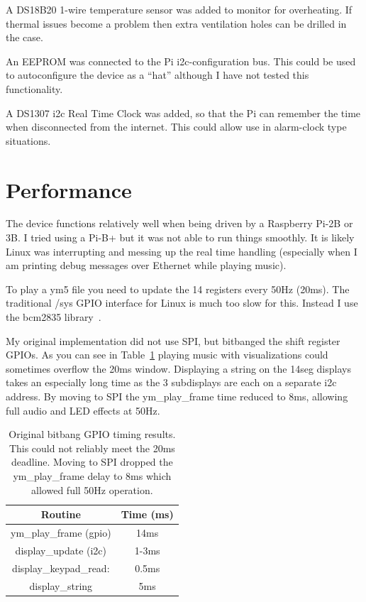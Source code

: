 \documentclass[11pt]{article}
\begin{document}
A DS18B20 1-wire temperature sensor was added to monitor for overheating.
If thermal issues become a problem then
extra ventilation holes can be drilled in the case.

An EEPROM was connected to the Pi i2c-configuration bus.
This could be used to autoconfigure the device as a ``hat'' although
I have not tested this functionality.

A DS1307 i2c Real Time Clock was added, so that the Pi can remember
the time when disconnected from the internet.
This could allow use in alarm-clock type situations.


\section{Performance}

The device functions relatively well when being driven by a 
Raspberry Pi-2B or 3B.
I tried using a Pi-B+ but it was not able to run things smoothly.
It is likely Linux was interrupting and messing up the real time handling
(especially when I am printing debug messages over Ethernet while playing
music).

To play a ym5 file you need to update the 14 registers every 50Hz
(20ms).
The traditional /sys GPIO interface for Linux is much too slow for this.
Instead I use the bcm2835 library~\cite{bcm2835}.

My original implementation did not use SPI, but bitbanged the 
shift register GPIOs.
As you can see in Table~\ref{table:timings} playing music with
visualizations could sometimes overflow the 20ms window.
Displaying a string on the 14seg displays takes an especially long time
as the 3 subdisplays are each on a separate i2c address.
By moving to SPI the ym\_play\_frame time reduced to 8ms, allowing
full audio and LED effects at 50Hz.

\begin{table}[t]
\caption{Original bitbang GPIO timing results.
This could not reliably meet the 20ms deadline.
Moving to SPI dropped the ym\_play\_frame delay to 8ms
which allowed full 50Hz operation.
\label{table:timings}}
\sf
\centering
\begin{tabular}{|c|c|}
\hline
Routine	& Time (ms) \\
\hline
\hline
ym\_play\_frame (gpio) & 14ms \\
\hline
display\_update (i2c) & 1-3ms \\
\hline
display\_keypad\_read: & 0.5ms \\
\hline
display\_string       & 5ms \\
\hline
\end{tabular}
\end{table}
\end{document}
